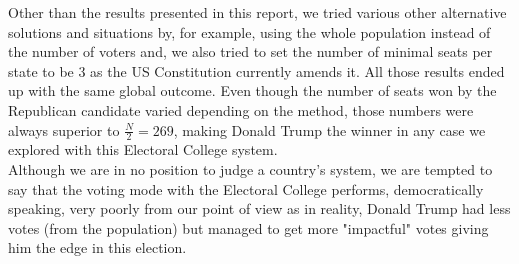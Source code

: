 \documentclass[a4paper,9pt,calibri,oneside,openany, twocolumn]{report}
\theoremstyle{break}
\begin{document}
Other than the results presented in this report, we tried various other alternative solutions and situations by, for example, using the whole population instead of the number of voters and, we also tried to set the number of minimal seats per state to be $3$ as the US Constitution currently amends it. All those results ended up with the same global outcome. Even though the number of seats won by the Republican candidate varied depending on the method, those numbers were always superior to $\frac N2 = 269$, making Donald Trump the winner in any case we explored with this Electoral College system.\\

Although we are in no position to judge a country's system, we are tempted to say that the voting mode with the Electoral College performs, democratically speaking, very poorly from our point of view as in reality, Donald Trump had less votes (from the population) but managed to get more "impactful" votes giving him the edge in this election.\\
\end{document}
